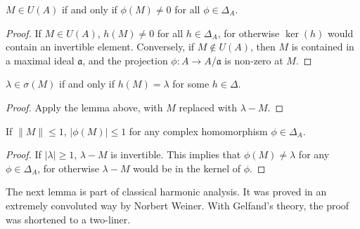 \begin{lemma}
    $M \in U(A)$ if and only if $\phi(M) \neq 0$ for all $\phi \in \Delta_A$.
\end{lemma}
\begin{proof}
    If $M \in U(A)$, $h(M) \neq 0$ for all $h \in \Delta_A$, for otherwise $\ker(h)$ would contain an invertible element. Conversely, if $M \not \in U(A)$, then $M$ is contained in a maximal ideal $\mathfrak{a}$, and the projection $\phi: A \to A/\mathfrak{a}$ is non-zero at $M$.
\end{proof}

\begin{corollary}
    $\lambda \in \sigma(M)$ if and only if $h(M) = \lambda$ for some $h \in \Delta$.
\end{corollary}
\begin{proof}
    Apply the lemma above, with $M$ replaced with $\lambda - M$.
\end{proof}

\begin{lemma}
    If $\|M\| \leq 1$,  $| \phi(M) | \leq 1$ for any complex homomorphism $\phi \in \Delta_A$.
\end{lemma}
\begin{proof}
    If $|\lambda| \geq 1$, $\lambda - M$ is invertible. This implies that $\phi(M) \neq \lambda$ for any $\phi \in \Delta_A$, for otherwise $\lambda - M$ would be in the kernel of $\phi$.
\end{proof}

The next lemma is part of classical harmonic analysis. It was proved in an extremely convoluted way by Norbert Weiner. With Gelfand's theory, the proof was shortened to a two-liner.

